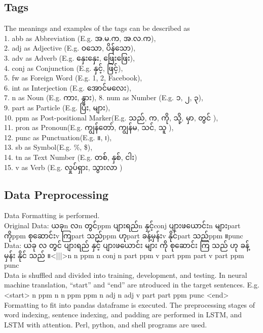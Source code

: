 \documentclass[conference]{IEEEtran}
\newcommand{\quotes}[1]{``#1''}
\begin{document}
\subsection{Tags}
The meanings and examples of the tags can be described as \\
1. abb as Abbreviation (E.g. {\padauktext အ.မ.က, အ.လ.က)},\\
2. adj as Adjective (E.g. {\padauktext ဝသော, ပိန်သော}),\\
3. adv as Adverb (E.g. {\padauktext နှေးနှေး, ဖြေးဖြေး}), \\
4. conj as Conjunction (E.g. {\padauktext နှင့်, ဖြင့်}),\\
5. fw as Foreign Word (E.g. 1, 2, Facebook),\\
6. int as Interjection (E.g. {\padauktext အောင်မလေး}),\\
7. n as Noun (E.g. {\padauktext ကား, နွား}),
8. num as Number (E.g. {\padauktext ၁, ၂, ၃}),\\
9. part as Particle (E.g. {\padauktext ပြီး, များ}),\\ 
10. ppm as Post-positional Marker(E.g. {\padauktext သည်, က, ကို, သို့, မှာ, တွင်} ),\\
11. pron as Pronoun(E.g. {\padauktext ကျွန်တော်, ကျွန်မ, သင်, သူ} ),\\
12. punc as Punctuation(E.g. {\padauktext ။, ၊}),\\
13. sb as Symbol(E.g. \%, \$),\\
14. tn as Text Number (E.g. {\padauktext တစ်, နှစ်, ငါး})\\
15. v as Verb (E.g. {\padauktext လှုပ်ရှား, သွားလာ} )\\

\subsection {Data Preprocessing}
Data Formatting is performed.\\
\noindent Original Data: {\padauktext ယခု\/n လ\/n တွင်\/ppm ပျားရည်\/n နှင့်\/conj ပျားဖယောင်း\/n များ\/part ကို\/ppm စုဆောင်း\/v ကြ\/part သည်\/ppm ဟု\/part ခန့်မှန်း\/v နိုင်\/part သည်\/ppm ။\/punc}\\
\noindentFormatted Data: {\padauktext ယခု လ တွင် ပျားရည် နှင့် ပျားဖယောင်း များ ကို စုဆောင်း ကြ သည် ဟု ခန့်မှန်း နိုင် သည် ။<|||>n n ppm n conj n part ppm v part ppm part v part ppm punc}\\
Data is shuffled and divided into training, development, and testing.
In neural machine translation, \quotes{start} and \quotes{end} are ntroduced  in the target sentences.
E.g. <start> n ppm n n ppm ppm n adj n adj v part part ppm punc <end>
Formatting to fit into pandas dataframe is executed.
The preprocessing stages of word indexing, sentence indexing, and padding are performed in LSTM, and  LSTM with attention.
Perl, python, and shell programs are used.
\end{document}
